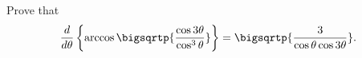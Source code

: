 Prove that
\[
\frac{d}{d\theta}\left\{
  \arccos \bigsqrtp{\frac{\cos 3\theta}{\cos^{3}\theta}}
\right\}
  = \bigsqrtp{\frac{3}{\cos\theta \cos 3\theta}}.
\]

